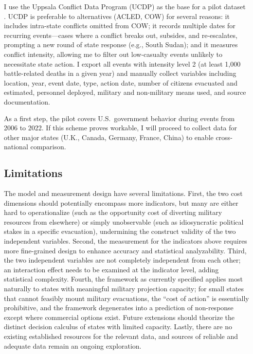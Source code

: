 \documentclass[12pt]{article}
\begin{document}
I use the Uppsala Conflict Data Program (UCDP) as the base for a pilot dataset \citep{Davies2024}. UCDP is preferable to alternatives (ACLED, COW) for several reasons: it includes intra-state conflicts omitted from COW; it records multiple dates for recurring events---cases where a conflict breaks out, subsides, and re-escalates, prompting a new round of state response (e.g., South Sudan); and it measures conflict intensity, allowing me to filter out low-casualty events unlikely to necessitate state action. I export all events with intensity level 2 (at least 1,000 battle-related deaths in a given year) and manually collect variables including location, year, event date, type, action date, number of citizens evacuated and estimated, personnel deployed, military and non-military means used, and source documentation.

As a first step, the pilot covers U.S.\ government behavior during events from 2006 to 2022. If this scheme proves workable, I will proceed to collect data for other major states (U.K., Canada, Germany, France, China) to enable cross-national comparison.

\subsection{Limitations}

The model and measurement design have several limitations. First, the two cost dimensions should potentially encompass more indicators, but many are either hard to operationalize (such as the opportunity cost of diverting military resources from elsewhere) or simply unobservable (such as idiosyncratic political stakes in a specific evacuation), undermining the construct validity of the two independent variables. Second, the measurement for the indicators above requires more fine-grained design to enhance accuracy and statistical analyzability. Third, the two independent variables are not completely independent from each other; an interaction effect needs to be examined at the indicator level, adding statistical complexity. Fourth, the framework as currently specified applies most naturally to states with meaningful military projection capacity; for small states that cannot feasibly mount military evacuations, the ``cost of action'' is essentially prohibitive, and the framework degenerates into a prediction of non-response except where commercial options exist. Future extensions should theorize the distinct decision calculus of states with limited capacity. Lastly, there are no existing established resources for the relevant data, and sources of reliable and adequate data remain an ongoing exploration.
\end{document}

